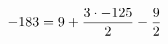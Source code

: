 \documentclass[preview]{standalone}
\begin{document}
\begin{align*}
\special{dvisvgm:raw <g id='unique000'>}-183 = 9 +\frac{3 \cdot -125}{2} - \frac{9}{2}\special{dvisvgm:raw </g>}
\end{align*}
\end{document}
